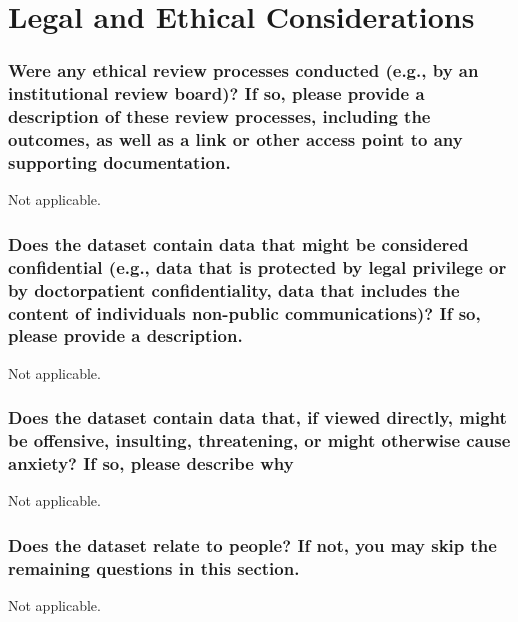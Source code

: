 \documentclass{article}
\newcommand{\question}[1]{#1}
\begin{document}

\section{Legal and Ethical Considerations}

\question{\subsubsection*{Were any ethical review processes conducted (e.g., by an institutional review board)? If so, please provide a description of these review
		processes, including the outcomes, as well as a link or other access point
		to any supporting documentation.}}

Not applicable.

\question{\subsubsection*{Does the dataset contain data that might be considered confidential
		(e.g., data that is protected by legal privilege or by doctorpatient confidentiality, data that includes the content of individuals non-public
		communications)? If so, please provide a description.}}

Not applicable.

\question{\subsubsection*{Does the dataset contain data that, if viewed directly, might be offensive, insulting, threatening, or might otherwise cause anxiety? If so,
		please describe why}}

Not applicable.

\question{\subsubsection*{Does the dataset relate to people? If not, you may skip the remaining
		questions in this section.}}

Not applicable.

\end{document}
